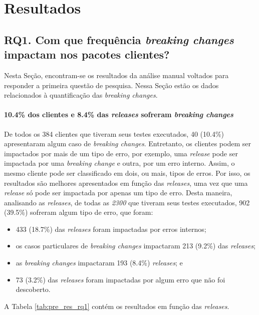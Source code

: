 \chapter{Resultados}
\label{cap:results}

\section{RQ1. Com que frequência \textit{breaking changes} impactam nos pacotes clientes?}

Nesta Seção, encontram-se os resultados da análise manual voltados para responder a primeira questão de pesquisa. Nessa Seção estão os dados relacionados à quantificação das \textit{breaking changes}.

\subsubsection{\textbf{10.4\% dos clientes e 8.4\% das \textit{releases} sofreram \textit{breaking changes}}}

De todos os 384 clientes que tiveram seus testes executados, 40 (10.4\%) apresentaram algum caso de \textit{breaking changes}. Entretanto, os clientes podem ser impactados por mais de um tipo de erro, por exemplo, uma \textit{release} pode ser impactada por uma \textit{breaking change} e outra, por um erro interno. Assim, o mesmo cliente pode ser classificado em dois, ou mais, tipos de erros. Por isso, os resultados são melhores apresentados em função das \textit{releases}, uma vez que uma \textit{release} só pode ser impactada por apenas um tipo de erro. Desta maneira, analisando as \textit{releases}, de todas as \textit{2300} que tiveram seus testes executados, 902 (39.5\%) sofreram algum tipo de erro, que foram:

\begin{itemize}
    \item 433 (18.7\%) das \textit{releases} foram impactadas por erros internos;
    \item os casos particulares de \textit{breaking changes} impactaram 213 (9.2\%) das \textit{releases};
    \item as \textit{breaking changes} impactaram 193 (8.4\%) \textit{releases}; e
    \item 73 (3.2\%) das \textit{releases} foram impactadas por algum erro que não foi descoberto.
\end{itemize}{}

A Tabela \ref{tab:pre_res_rq1} contém os resultados em função das \textit{releases}.

